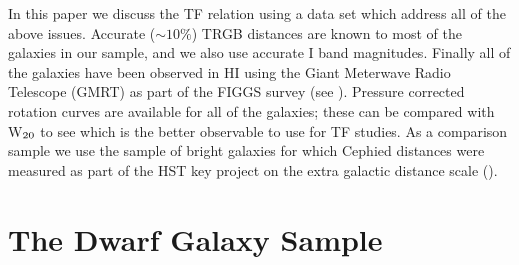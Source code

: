 \documentclass[useAMS,usenatbib]{mn2e}
\begin{document}
In this paper we discuss the TF relation using a data set which address all of the above issues. Accurate ($\sim 10\%$) TRGB distances are known to most of the galaxies in our sample, and we also use accurate I band magnitudes. Finally all of the galaxies have been observed in HI using the Giant Meterwave Radio Telescope (GMRT) as part of the FIGGS survey (see \cite{begum08}). Pressure corrected rotation curves are available for all of the galaxies; these can be compared with W$_{\rm 20}$ to see which is the better observable to use for TF studies. As a comparison sample we use the sample of bright galaxies for which Cephied distances were measured as part of the HST key project on the extra galactic distance scale (\cite{sakai00}).

\section[]{The Dwarf Galaxy Sample }
\label{sec:obs}
\end{document}
